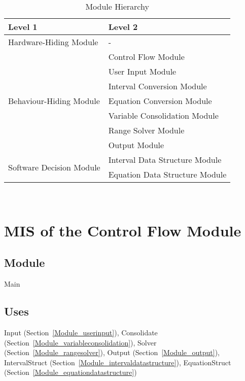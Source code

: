 \documentclass[12pt, titlepage]{article}
\begin{document}
\begin{table}[h!]
	\centering
	\begin{tabular}{p{} p{}}
		\toprule
		\textbf{Level 1} & \textbf{Level 2}\\
		\midrule
		
		{Hardware-Hiding Module} & - \\
		\midrule
		
		\multirow{7}{0.29\textwidth}{Behaviour-Hiding Module} & Control Flow 
		Module \\
		& User Input Module \\
		& Interval Conversion Module \\
		& Equation Conversion Module \\
		& Variable Consolidation Module \\
		& Range Solver Module \\
		& Output Module \\
		\midrule
		
		\multirow{2}{0.29\textwidth}{Software Decision Module} & Interval Data 
		Structure Module \\
		& Equation Data Structure Module \\
		\bottomrule
		
	\end{tabular}
	\caption{Module Hierarchy}
	\label{TblMH}
\end{table}

\newpage
~\newpage

\section{MIS of the Control Flow Module} 
\label{Module_controlflow}

\subsection{Module}

Main

\subsection{Uses}

Input (Section~\ref{Module_userinput}), Consolidate 
(Section~\ref{Module_variableconsolidation}), Solver 
(Section~\ref{Module_rangesolver}), Output (Section~\ref{Module_output}), 
IntervalStruct (Section~\ref{Module_intervaldatastructure}), EquationStruct 
(Section~\ref{Module_equationdatastructure})
\end{document}

